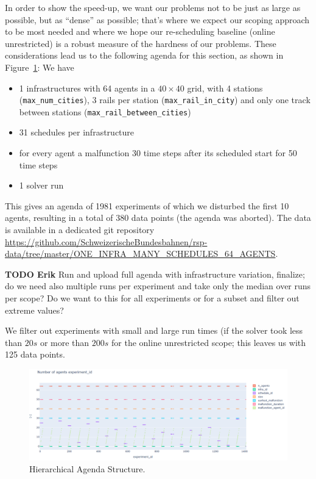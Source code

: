 \documentclass{article}
\begin{document}
In order to show the speed-up, we want our problems not to be just as large as possible, but as ``dense'' as possible; that's where we expect our scoping approach to be most needed and where we hope our re-scheduling baseline (online unrestricted) is a robust measure of the hardness of our problems.
These considerations lead us  to the following agenda for this section, as shown in Figure~\ref{fig:agenda}: We have
\begin{itemize}
    \item 1 infrastructures with 64 agents in a $40\times 40$ grid, with 4 stations (\texttt{max\_num\_cities}), 3 rails per station (\texttt{max\_rail\_in\_city}) and only one track between stations (\texttt{max\_rail\_between\_cities})
    \item 31 schedules per infrastructure
    \item for every agent a malfunction 30 time steps after its scheduled start for 50 time steps
    \item 1 solver run
\end{itemize}
This gives an agenda of 1981 experiments of which we disturbed the first 10 agents, resulting in a total of 380 data points (the agenda was aborted).
The data is available in a dedicated git repository \url{https://github.com/SchweizerischeBundesbahnen/rsp-data/tree/master/ONE_INFRA_MANY_SCHEDULES_64_AGENTS}.
%

\begin{mdframed}
{\bf TODO Erik} Run and upload full agenda with infrastructure variation, finalize; do we need also multiple runs per experiment and take only the median over runs per scope? Do we want to this for all experiments or for a subset and filter out extreme values?
\end{mdframed}


We filter out experiments with small and large run times (if the solver took less than $20s$ or more than $200s$ for the online unrestricted scope; this leaves us with 125 data points.

\begin{figure}[hbtp]
    \includegraphics[width=\textwidth]{Figures/04_computational_results/agenda.PNG}
	\caption{Hierarchical Agenda Structure.}
	\label{fig:agenda}
\end{figure}
\end{document}
